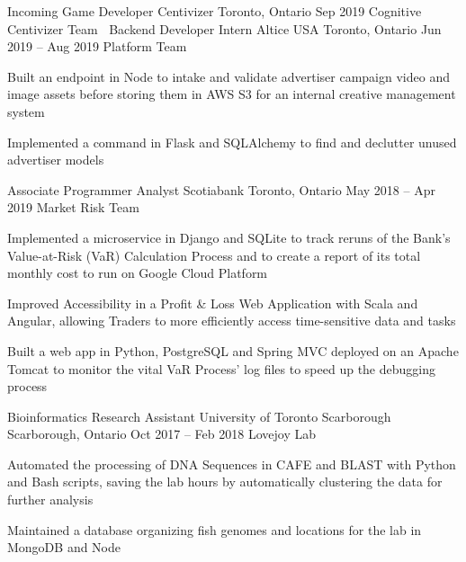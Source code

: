 \begin{cventries}
  \cventry
    {Incoming Game Developer}
    {Centivizer}
    {Toronto, Ontario}
    {Sep 2019}
    {Cognitive Centivizer Team}
    {
      $\:$
    }
  \cventry
    {Backend Developer Intern}
    {Altice USA}
    {Toronto, Ontario}
    {Jun 2019 -- Aug 2019}
    {Platform Team}
    {
    \begin{cvitems}
      \item {Built an endpoint in Node to intake and validate advertiser campaign video and image assets before storing them in AWS S3 for an internal creative management system}
      \item {Implemented a command in Flask and SQLAlchemy to find and declutter unused advertiser models}
    \end{cvitems}
    }
  \cventry
    {Associate Programmer Analyst}
    {Scotiabank}
    {Toronto, Ontario}
    {May 2018 -- Apr 2019}
    {Market Risk Team}
    {
      \begin{cvitems}
        \item {Implemented a microservice in Django and SQLite to track reruns of the Bank's Value-at-Risk (VaR) Calculation Process and to create a report of its total monthly cost to run on Google Cloud Platform}
        \item {Improved Accessibility in a Profit \& Loss Web Application with Scala and Angular, allowing Traders to more efficiently access time-sensitive data and tasks}
        \item {Built a web app in Python, PostgreSQL and Spring MVC deployed on an Apache Tomcat to monitor the vital VaR Process' log files to speed up the debugging process}
      \end{cvitems}
    }

  \cventry
    {Bioinformatics Research Assistant}
    {University of Toronto Scarborough}
    {Scarborough, Ontario}
    {Oct 2017 -- Feb 2018}
    {Lovejoy Lab}
    {
      \begin{cvitems}
        \item {Automated the processing of DNA Sequences in CAFE and BLAST with Python and Bash scripts, saving the lab hours by automatically clustering the data for further analysis}
        \item {Maintained a database organizing fish genomes and locations for the lab in MongoDB and Node}
      \end{cvitems}
    }
\end{cventries}
